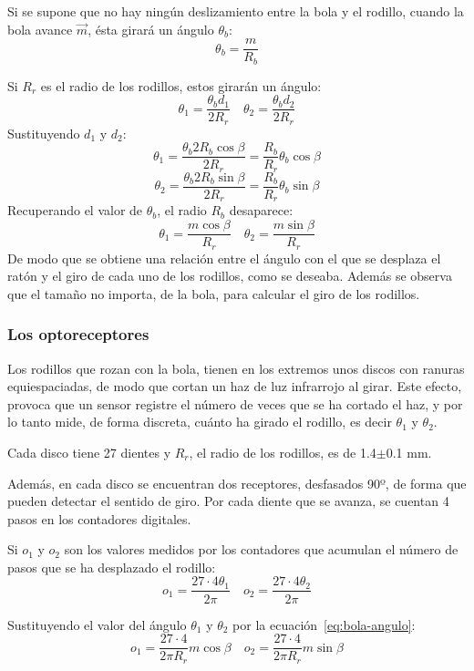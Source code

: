 \documentclass[10pt,a4paper,hidelinks,twocolumn]{article}
\begin{document}
Si se supone que no hay ningún deslizamiento entre la bola y el rodillo, cuando 
la bola avance $\vec{m}$, ésta girará un ángulo $\theta_b$:
$$ \theta_b = \frac{m}{R_b} $$

Si $R_r$ es el radio de los rodillos, estos girarán un ángulo:
$$ \theta_1 = \frac{\theta_b d_1}{2R_r} \quad
	\theta_2 = \frac{\theta_b d_2}{2R_r}$$
Sustituyendo $d_1$ y $d_2$:
$$ \theta_1 = \frac{\theta_b 2R_b\cos \beta}{2R_r} =
	\frac{R_b}{R_r}\theta_b\cos \beta$$
$$ \theta_2 = \frac{\theta_b 2R_b\sin \beta}{2R_r} =
	\frac{R_b}{R_r}\theta_b\sin \beta$$
Recuperando el valor de $\theta_b$, el radio $R_b$ desaparece:
\begin{equation}
\theta_1 = \frac{m \cos \beta}{R_r} \quad
\theta_2 = \frac{m \sin \beta}{R_r} \label{eq:bola-angulo}
\end{equation}
De modo que se obtiene una relación entre el ángulo con el que se desplaza el 
ratón y el giro de cada uno de los rodillos, como se deseaba. Además se observa 
que el tamaño no importa, de la bola, para calcular el giro de los rodillos.
\subsubsection{Los optoreceptores}

Los rodillos que rozan con la bola, tienen en los extremos unos discos con
ranuras equiespaciadas, de modo que cortan un haz de luz infrarrojo al girar.  
Este efecto, provoca que un sensor registre el número de veces que se ha cortado 
el haz, y por lo tanto mide, de forma discreta, cuánto ha girado el rodillo, es 
decir $\theta_1$ y $\theta_2$.


Cada disco tiene 27 dientes y $R_r$, el radio de los rodillos, es de 
1.4$\pm$0.1 mm.

Además, en cada disco se encuentran dos receptores, desfasados 90º, de forma que 
pueden detectar el sentido de giro. Por cada diente que se avanza, se cuentan 4 
pasos en los contadores digitales.

Si $o_1$ y $o_2$ son los valores medidos por los contadores que acumulan el 
número de pasos que se ha desplazado el rodillo:
$$o_1 = \frac{27 \cdot 4 \theta_1}{2\pi} \quad 
o_2 = \frac{27 \cdot 4 \theta_2}{2\pi}$$

Sustituyendo el valor del ángulo $\theta_1$ y $\theta_2$ por la 
ecuación~\ref{eq:bola-angulo}:
$$ o_1 = \frac{27\cdot4}{2 \pi R_r} m \cos \beta \quad
	o_2 = \frac{27\cdot4}{2 \pi R_r} m \sin \beta $$
\end{document}
